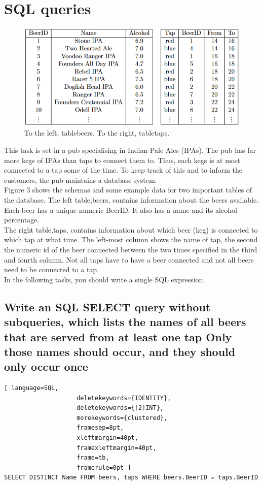 \documentclass[12pt, a4paper]{article}
\newcommand{\beginSQL}{\begin{lstlisting}[ language=SQL,
                    deletekeywords={IDENTITY},
                    deletekeywords={[2]INT},
                    morekeywords={clustered},
                    framesep=8pt,
                    xleftmargin=40pt,
                    framexleftmargin=40pt,
                    frame=tb,
                    framerule=0pt ]}
\begin{document}
	\section{SQL queries}
	\begin{figure}[h!]
		\includegraphics[width=\textwidth]{assets/sql.png}
		\centering
		\caption{To the left, tablebeers.  To the right, tabletaps.}
	\end{figure}
	This task is set in a pub specialising in Indian Pale Ales (IPAs).  The pub has far more kegs of IPAs than taps to connect them to. Thus, each kegs is at most connected to a tap some of the time.  To keep track of this and to inform the customers, the pub maintains a database system.\\
	Figure 3 shows the schemas and some example data for two important tables of the database.  The left table,beers,  contains information about the beers available. Each beer has a unique numeric BeerID. It also has a name and its alcohol percentage.\\
	The right table,taps,  contains information about which beer (keg) is connected to which tap at what time. The left-most column shows the name of tap, the second the numeric id of the beer connected between the two times specified in the third and fourth column.  Not all taps have to have a beer connected and not all beers need to be connected to a tap.\\
	In the following tasks, you should write a single SQL expression.
	
		\subsection{Write an SQL SELECT query without subqueries, which lists the names of all beers that are served from at least one tap Only those names should occur, and they should only occur once}
			\beginSQL
SELECT DISTINCT Name FROM beers, taps WHERE beers.BeerID = taps.BeerID\end{lstlisting}
\end{document}

